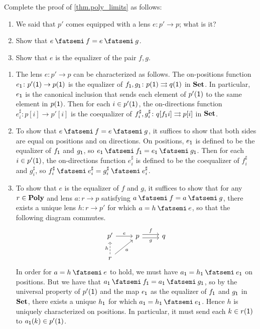 \documentclass[Book-Poly]{subfiles}
\begin{document}
\begin{exercise}\label{exc.poly_limits}
Complete the proof of \cref{thm.poly_limits} as follows:
\begin{enumerate}
	\item We said that $p'$ comes equipped with a lens $e \colon p' \to p$; what is it?
	\item Show that $e \then f = e \then g$.
	\item Show that $e$ is the equalizer of the pair $f,g$.
\qedhere
\end{enumerate}
\begin{solution}
\begin{enumerate}
    \item The lens $e \colon p' \to p$ can be characterized as follows.
    The on-positions function $e_{\textsf{1}} \colon p'(\textsf{1}) \to p(\textsf{1})$ is the equalizer of $f_{\textsf{1}}, g_{\textsf{1}} \colon p(\textsf{1}) \rightrightarrows q(\textsf{1})$ in $\mathbf{Set}$.
    In particular, $e_{\textsf{1}}$ is the canonical inclusion that sends each element of $p'(\textsf{1})$ to the same element in $p(\textsf{1})$.
    Then for each $i \in p'(\textsf{1})$, the on-directions function $e^\sharp_i \colon p[i] \to p'[i]$ is the coequalizer of $f^\sharp_i, g^\sharp_i \colon q[f_{\textsf{1}}i] \rightrightarrows p[i]$ in $\mathbf{Set}$.

    \item To show that $e \then f = e \then g$, it suffices to show that both sides are equal on positions and on directions.
    On positions, $e_{\textsf{1}}$ is defined to be the equalizer of $f_{\textsf{1}}$ and $g_{\textsf{1}}$, so $e_\1 \then f_\1 = e_\1 \then g_\1$.
    Then for each $i \in p'(\textsf{1})$, the on-directions function $e^\sharp_i$ is defined to be the coequalizer of $f^\sharp_i$ and $g^\sharp_i$, so $f^\sharp_i \then e^\sharp_i = g^\sharp_i \then e^\sharp_i$.

    \item To show that $e$ is the equalizer of $f$ and $g$, it suffices to show that for any $r \in \mathbf{Poly}$ and lens $a \colon r \to p$ satisfying $a \then f = a \then g$, there exists a unique lens $h \colon r \to p'$ for which $a = h \then e$, so that the following diagram commutes.
    \begin{equation*} %
    \begin{tikzcd}
        p' \ar[r, "e"] & p \ar[r, "f", shift left] \ar[r, "g"', shift right] & q \\
        r \ar[u, "h", dashed] \ar[ur, "a"']
    \end{tikzcd}
    \end{equation*}
    In order for $a = h \then e$ to hold, we must have $a_\1 = h_\1 \then e_\1$ on positions.
    But we have that $a_\1 \then f_\1 = a_\1 \then g_\1$, so by the universal property of $p'(\textsf{1})$ and the map $e_{\textsf{1}}$ as the equalizer of $f_{\textsf{1}}$ and $g_{\textsf{1}}$ in $\mathbf{Set}$, there exists a unique $h_{\textsf{1}}$ for which $a_\1 = h_\1 \then e_\1$.
    Hence $h$ is uniquely characterized on positions.
    In particular, it must send each $k \in r(\textsf{1})$ to $a_{\textsf{1}}(k) \in p'(\textsf{1})$.


\end{enumerate}
\end{solution}
\end{exercise}
\end{document}
